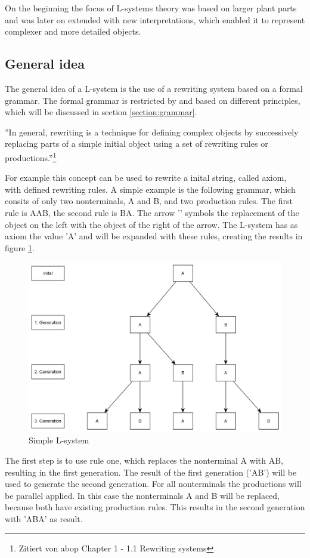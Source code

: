 \documentclass[english]{cpp-hmwk}
\begin{document}
On the beginning the focus of L-systems theory was based on larger plant parts and was later on extended with new interpretations, which enabled it to represent complexer and more detailed objects.

\subsection{General idea}
The general idea of a L-system is the use of a rewriting system based on a formal grammar. The formal grammar is restricted by and based on different principles, which will be discussed in section \ref{section:grammar}.

''In general, rewriting is a technique for defining complex objects by successively replacing parts of a simple initial object using a set of rewriting rules or productions.''\footnote{Zitiert von abop Chapter 1  - 1.1 Rewriting systems}

For example this concept can be used to rewrite a inital string, called axiom, with defined rewriting rules.
A simple example is the following grammar, which consits of only two nonterminals, A and B, and two production rules. 
The first rule is A\rightarrow AB, the second rule is B\rightarrow A. The arrow '\rightarrow' symbols the replacement of the object on the left with the object of the right of the arrow.
The L-system has as axiom the value 'A' and will be expanded with these rules, creating the results in figure \ref{figure:simple_lsystem}.

\begin{figure}[h!]
	\centering
	\includegraphics[width=0.7\columnwidth]{../graphs/Examples/simple_lsystem.png}
	\caption{Simple L-system}
	\label{figure:simple_lsystem}
\end{figure}

The first step is to use rule one, which replaces the nonterminal A with AB, resulting in the first generation. The result of the first generation ('AB') will be used to generate the second generation.
For all nonterminals the productions will be parallel applied. In this case the nonterminals A and B will be replaced, because both have existing production rules. This results in the second generation with 'ABA' as result.
\end{document}
